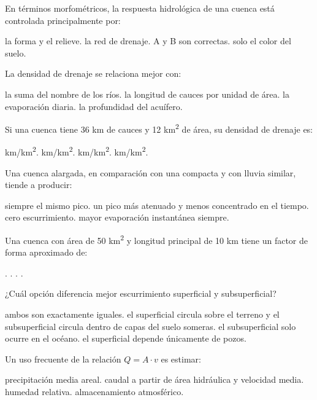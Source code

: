 \question [3] En términos morfométricos, la respuesta hidrológica de una cuenca está controlada principalmente por:
\begin{choices}
\choice la forma y el relieve.
\choice la red de drenaje.
\CorrectChoice A y B son correctas.
\choice solo el color del suelo.
\end{choices}

\question [3] La densidad de drenaje se relaciona mejor con:
\begin{choices}
\choice la suma del nombre de los ríos.
\CorrectChoice la longitud de cauces por unidad de área.
\choice la evaporación diaria.
\choice la profundidad del acuífero.
\end{choices}

\question [3] Si una cuenca tiene 36 km de cauces y 12 km\textsuperscript{2} de área, su densidad de drenaje es:
\begin{choices}
 km/km\textsuperscript{2}.
 km/km\textsuperscript{2}.
 km/km\textsuperscript{2}.
 km/km\textsuperscript{2}.
\end{choices}

\question [3] Una cuenca alargada, en comparación con una compacta y con lluvia similar, tiende a producir:
\begin{choices}
\choice siempre el mismo pico.
\CorrectChoice un pico más atenuado y menos concentrado en el tiempo.
\choice cero escurrimiento.
\choice mayor evaporación instantánea siempre.
\end{choices}

\question [3] Una cuenca con área de 50 km\textsuperscript{2} y longitud principal de 10 km tiene un factor de forma aproximado de:
\begin{choices}
.
.
.
.
\end{choices}

\question [3] ¿Cuál opción diferencia mejor escurrimiento superficial y subsuperficial?
\begin{choices}
\choice ambos son exactamente iguales.
\CorrectChoice el superficial circula sobre el terreno y el subsuperficial circula dentro de capas del suelo someras.
\choice el subsuperficial solo ocurre en el océano.
\choice el superficial depende únicamente de pozos.
\end{choices}

\question [3] Un uso frecuente de la relación \(Q = A \cdot v\) es estimar:
\begin{choices}
\choice precipitación media areal.
\CorrectChoice caudal a partir de área hidráulica y velocidad media.
\choice humedad relativa.
\choice almacenamiento atmosférico.
\end{choices}


